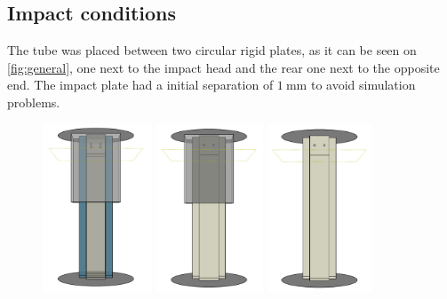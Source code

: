 \documentclass[cmfonts]{witpress}
\begin{document}
\subsection{Impact conditions}  %
\label{sec:impact}

The tube was placed between two circular rigid plates, as it can be seen on \cref{fig:general}, one next to the impact head and the rear one next to the opposite end. The impact plate had a initial separation of $\SI{1}{\mm}$ to avoid simulation problems.

\begin{figure}
	\centering
	\begin{minipage}[b]{.22\linewidth}
		\centering
		\includegraphics[height=5cm]{figures/IMG_CUTRES/general_transp}
	\end{minipage}
	\quad
	\begin{minipage}[b]{.22\linewidth}
		\centering
		\includegraphics[height=5cm]{figures/IMG_CUTRES/general_rigtransp}
	\end{minipage}
	\quad
	\begin{minipage}[b]{.22\linewidth}
		\centering
		\includegraphics[height=5cm]{figures/IMG_CUTRES/general_noSb}

\end{minipage}
\end{figure}
\end{document}
